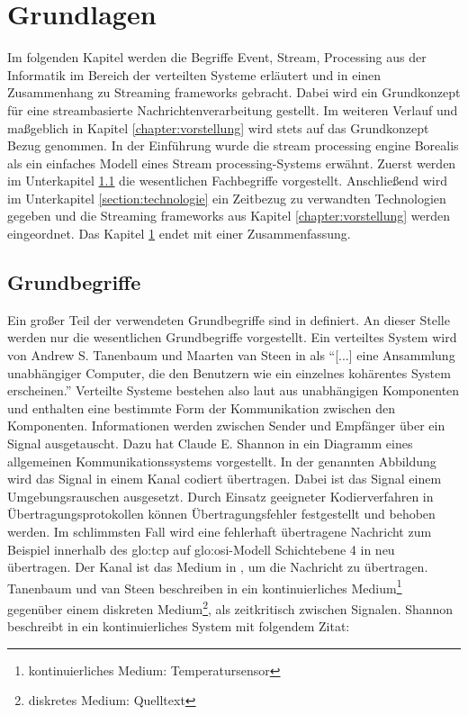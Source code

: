 \chapter{Grundlagen}
\label{chapter:grundlagen}

Im folgenden Kapitel werden die Begriffe Event, Stream, Processing aus der Informatik im Bereich der verteilten Systeme erläutert und in einen Zusammenhang zu Streaming frameworks gebracht. Dabei wird ein Grundkonzept für eine streambasierte Nachrichtenverarbeitung gestellt. Im weiteren Verlauf und maßgeblich in Kapitel \ref{chapter:vorstellung} wird stets auf das Grundkonzept Bezug genommen. In der Einführung wurde die stream processing engine Borealis  als ein einfaches Modell eines Stream processing-Systems erwähnt. Zuerst werden im Unterkapitel \ref{section:grundbegriffe} die wesentlichen Fachbegriffe vorgestellt. Anschließend wird im Unterkapitel \ref{section:technologie} ein Zeitbezug zu verwandten Technologien gegeben und die Streaming frameworks aus Kapitel \ref{chapter:vorstellung} werden eingeordnet. Das Kapitel \ref{chapter:grundlagen} endet mit einer Zusammenfassung.

\section{Grundbegriffe}
\label{section:grundbegriffe}

Ein großer Teil der verwendeten Grundbegriffe sind in  definiert. An dieser Stelle werden nur die wesentlichen Grundbegriffe vorgestellt.
Ein verteiltes System wird von Andrew S. Tanenbaum und Maarten van Steen in  als \enquote{[...] eine Ansammlung unabhängiger Computer, die den Benutzern wie ein einzelnes kohärentes System erscheinen.} Verteilte Systeme bestehen also laut  aus unabhängigen Komponenten und enthalten eine bestimmte Form der Kommunikation zwischen den Komponenten. Informationen werden zwischen Sender und Empfänger über ein Signal ausgetauscht. Dazu hat Claude E. Shannon in  ein Diagramm eines allgemeinen Kommunikationssystems vorgestellt. In der genannten Abbildung wird das Signal in einem Kanal codiert übertragen. Dabei ist das Signal einem Umgebungsrauschen ausgesetzt. Durch Einsatz geeigneter Kodierverfahren in Übertragungsprotokollen können Übertragungsfehler festgestellt und behoben werden. Im schlimmsten Fall wird eine fehlerhaft übertragene Nachricht zum Beispiel innerhalb des \gls{glo:tcp} auf \gls{glo:osi}-Modell Schichtebene 4 in  neu übertragen. Der Kanal ist das Medium in , um die Nachricht zu übertragen. %
Tanenbaum und van Steen beschreiben in  ein kontinuierliches Medium\footnote{kontinuierliches Medium: Temperatursensor} gegenüber einem diskreten Medium\footnote{diskretes Medium: Quelltext}, als zeitkritisch zwischen Signalen. %
Shannon beschreibt in  ein kontinuierliches System mit folgendem Zitat:

